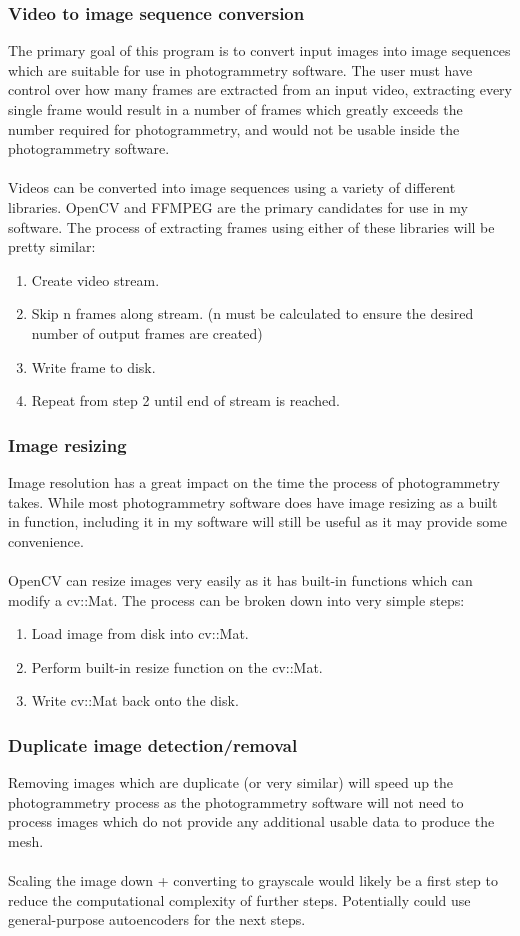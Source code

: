 \documentclass[11pt]{report}
\begin{document}
\subsubsection{Video to image sequence conversion}
The primary goal of this program is to convert input images into image sequences which are suitable for use in photogrammetry software.
The user must have control over how many frames are extracted from an input video, extracting every single frame would result in a number of frames which greatly exceeds the number required for photogrammetry, and would not be usable inside the photogrammetry software.\\\\
Videos can be converted into image sequences using a variety of different libraries. OpenCV and FFMPEG are the primary candidates for use in my software. The process of extracting frames using either of these libraries will be pretty similar:
\begin{enumerate}
\item Create video stream.
\item Skip n frames along stream. (n must be calculated to ensure the desired number of output frames are created)
\item Write frame to disk.
\item Repeat from step 2 until end of stream is reached.
\end{enumerate}
\subsubsection{Image resizing}
Image resolution has a great impact on the time the process of photogrammetry takes. While most photogrammetry software does have image resizing as a built in function, including it in my software will still be useful as it may provide some convenience.\\\\
OpenCV can resize images very easily as it has built-in functions which can modify a cv::Mat. The process can be broken down into very simple steps:
\begin{enumerate}
\item Load image from disk into cv::Mat.
\item Perform built-in resize function on the cv::Mat.
\item Write cv::Mat back onto the disk.
\end{enumerate}
\subsubsection{Duplicate image detection/removal}
Removing images which are duplicate (or very similar) will speed up the photogrammetry process as the photogrammetry software will not need to process images which do not provide any additional usable data to produce the mesh.\\\\
Scaling the image down + converting to grayscale would likely be a first step to reduce the computational complexity of further steps. Potentially could use general-purpose autoencoders for the next steps. 
\end{document}
